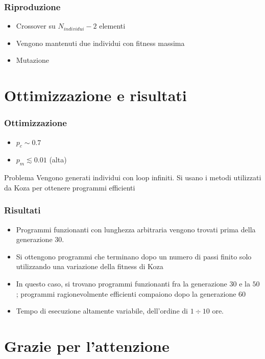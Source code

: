 \documentclass{beamer} %
\begin{document}
\begin{frame}
\frametitle{Riproduzione}
\begin{itemize}
\item Crossover su $N_{individui}-2$ elementi
\item Vengono mantenuti due individui con fitness massima
\item Mutazione
\end{itemize}
\end{frame}


\section{Ottimizzazione e risultati}
\begin{frame}
\frametitle{Ottimizzazione}
\begin{itemize}
\item $p_c \sim 0.7$
\item $p_m \lesssim 0.01$ (alta)
\end{itemize}

\begin{block}{Problema}
Vengono generati individui con loop infiniti. Si usano i metodi utilizzati da Koza per ottenere programmi efficienti
\end{block}
\end{frame}

\begin{frame}
\frametitle{Risultati}
\begin{itemize}
\item Programmi funzionanti con lunghezza arbitraria vengono trovati prima della generazione $30$.
\item Si ottengono programmi che terminano dopo un numero di passi finito solo utilizzando una variazione della fitness di Koza
\item In questo caso, si trovano programmi funzionanti fra la generazione $30$ e la $50$; programmi ragionevolmente efficienti compaiono dopo la generazione $60$
\item Tempo di esecuzione altamente variabile, dell'ordine di $1 \div 10$ ore.
\end{itemize}

\end{frame}


\section{Grazie per l'attenzione}
\end{document}
